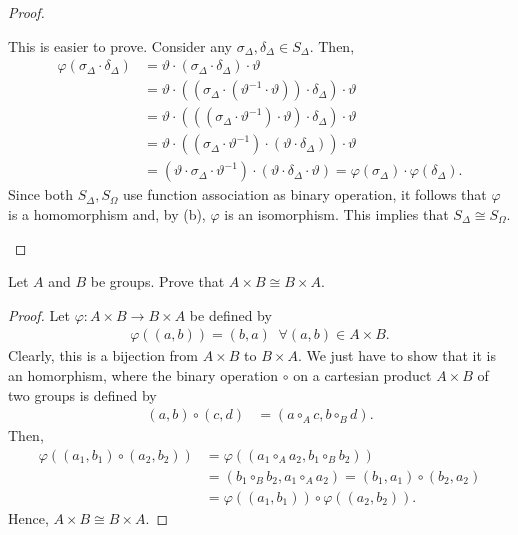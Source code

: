 \documentclass[12pt]{article}
\newenvironment{problem}[2][Problem]{\begin{trivlist} \item[\hskip \labelsep {\bfseries #1}\hskip \labelsep {\bfseries #2.}]}{\end{trivlist}}
\begin{document}
\begin{problem}{10}
\begin{proof}
\begin{enumerate}
    This is easier to prove. Consider any $\sigma_{\Delta},\delta_{\Delta}\in S_{\Delta}$. Then, 
\begin{align*}
  \varphi \left( \sigma_{\Delta}\cdot \delta_{\Delta} \right) &= \vartheta \cdot \left( \sigma_{\Delta}\cdot \delta_{\Delta} \right)\cdot \vartheta\\ 
  &= \vartheta \cdot \left( (\sigma_{\Delta}\cdot (\vartheta^{-1}\cdot \vartheta))\cdot \delta_{\Delta} \right)\cdot \vartheta\\ 
&= \vartheta \cdot \left( ((\sigma_{\Delta}\cdot \vartheta^{-1})\cdot \vartheta)\cdot \delta_{\Delta} \right)\cdot \vartheta\\ 
&= \vartheta \cdot \left( (\sigma_{\Delta}\cdot \vartheta^{-1})\cdot (\vartheta \cdot \delta_{\Delta}) \right)\cdot \vartheta\\ 
&= (\vartheta \cdot \sigma_{\Delta}\cdot \vartheta^{-1})\cdot (\vartheta \cdot \delta_{\Delta}\cdot \vartheta) = \varphi(\sigma_{\Delta}) \cdot \varphi(\delta_{\Delta}). 
\end{align*}
Since both $S_{\Delta},S_{\Omega}$ use function association as binary operation, it follows that $\varphi$ is a homomorphism and, by (b), $\varphi$ is an isomorphism. This implies that $S_{\Delta} \cong S_{\Omega}$.
\end{enumerate}
\end{proof}
\end{problem}

\begin{problem}{11}
  Let $A$ and $B$ be groups. Prove that $A\times B \cong B\times A$.
\begin{proof}
  Let $\varphi:A\times B\to B\times A$ be defined by 
\begin{align*}
  \varphi\left( (a,b) \right) = (b,a)\;\; \forall (a,b)\in A\times B.
\end{align*}
Clearly, this is a bijection from $A\times B$ to $B\times A$. We just have to show that it is an homorphism, where the binary operation $\circ$ on a cartesian product $A\times B$ of two groups is defined by
\begin{align*}
  (a,b) \circ (c,d) &= (a\circ_{A} c, b \circ_{B} d).
\end{align*}
Then,
\begin{align*}
  \varphi\left( (a_{1},b_{1})\circ(a_{2},b_{2}) \right) &= \varphi\left( (a_{1}\circ_{A} a_{2}, b_{1}\circ_{B} b_{2}) \right) \\
  &= \left( b_{1}\circ_{B} b_{2}, a_{1}\circ_{A} a_{2} \right) = \left( b_{1},a_{1} \right) \circ \left( b_{2},a_{2} \right)\\
  &= \varphi\left( (a_{1},b_{1}) \right) \circ \varphi\left( (a_{2},b_{2}) \right).
\end{align*}
Hence, $A\times B\cong B\times A$.
\end{proof}
\end{problem}
\end{document}
